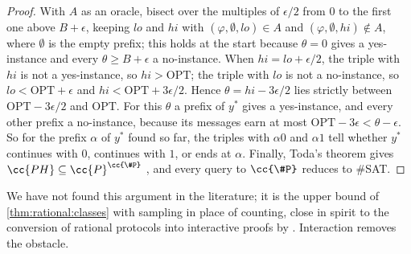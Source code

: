 \begin{refsection}
\begin{proof}
With $A$ as an oracle, bisect over the multiples of $\epsilon/2$ from $0$ to the first one above $B+\epsilon$, keeping $\mathit{lo}$ and $\mathit{hi}$ with $(\varphi,\emptyset,\mathit{lo})\in A$ and $(\varphi,\emptyset,\mathit{hi})\notin A$, where $\emptyset$ is the empty prefix; this holds at the start because $\theta=0$ gives a yes-instance and every $\theta\ge B+\epsilon$ a no-instance. When $\mathit{hi}=\mathit{lo}+\epsilon/2$, the triple with $\mathit{hi}$ is not a yes-instance, so $\mathit{hi}>\mathrm{OPT}$; the triple with $\mathit{lo}$ is not a no-instance, so $\mathit{lo}<\mathrm{OPT}+\epsilon$ and $\mathit{hi}<\mathrm{OPT}+3\epsilon/2$. Hence $\theta=\mathit{hi}-3\epsilon/2$ lies strictly between $\mathrm{OPT}-3\epsilon/2$ and $\mathrm{OPT}$. For this $\theta$ a prefix of $y^*$ gives a yes-instance, and every other prefix a no-instance, because its messages earn at most $\mathrm{OPT}-3\epsilon<\theta-\epsilon$. So for the prefix $\alpha$ of $y^*$ found so far, the triples with $\alpha0$ and $\alpha1$ tell whether $y^*$ continues with $0$, continues with $1$, or ends at $\alpha$. Finally, Toda's theorem gives $\cc{PH}\subseteq\cc{P}^{\cc{\#P}}$ \parencite{Toda1991}, and every query to $\cc{\#P}$ reduces to \#SAT.
\end{proof}

We have not found this argument in the literature; it is the upper bound of \cref{thm:rational:classes} with sampling in place of counting, close in spirit to the conversion of rational protocols into interactive proofs by \textcite{ChenMcCauleySingh2018}. Interaction removes the obstacle.



\end{refsection}

